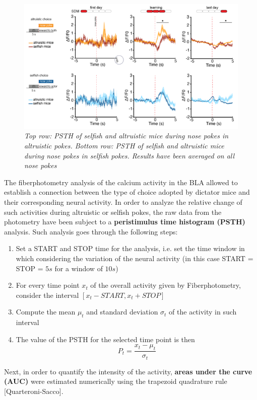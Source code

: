 \documentclass[a4paper]{article}
\begin{document}
\begin{figure}[H]
	\begin{center}
		\includegraphics[scale=0.77]{psth.png} 
	\end{center} 
	\caption{\textit{Top row: PSTH of selfish and altruistic mice during nose pokes in altruistic pokes. Bottom row:  PSTH of selfish and altruistic mice during nose pokes in selfish pokes. Results have been averaged on all nose pokes}}
	
\end{figure}

The fiberphotometry analysis of the calcium activity in the BLA allowed to establish a connection between the type of choice adopted by dictator mice and their corresponding neural activity. In order to analyze the relative change of such activities during altruistic or selfish pokes, the raw data from the photometry have been subject to a \textbf{peristimulus time histogram (PSTH)} analysis. Such analysis goes through the following steps:

\begin{enumerate}
	
	\item Set a START and STOP time for the analysis, i.e. set the time window in which considering the variation of the neural activity (in this case START = STOP = $5 s$ for a window of $10 s$)
	
	\item For every time point $x_t$ of the overall activity given by Fiberphotometry, consider the interval $[x_{t}-START , x_{t}+STOP]$
	
	\item Compute the mean $ \mu_t$ and standard deviation $\sigma_t$ of the activity in such interval
	
	\item The value of the PSTH for the selected time point is then
	$$ P_t = \frac{x_t - \mu_t}{\sigma_t}$$
\end{enumerate}
Next, in order to quantify the intensity of the activity, \textbf{areas under the curve (AUC)} were estimated numerically using the trapezoid quadrature rule [Quarteroni-Sacco].\\
\end{document}
